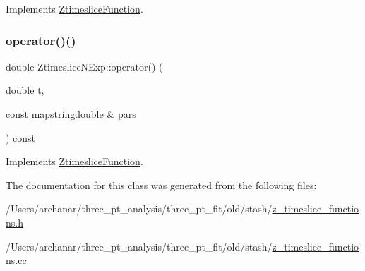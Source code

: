 Implements \mbox{\hyperlink{classZtimesliceFunction_aee3aaf0215deb7e33e609a3d227c28d5}{Ztimeslice\+Function}}.

\mbox{\label{classZtimesliceNExp_a8d550e27c4abc64a0498b224259863b7}} 
\subsubsection{\texorpdfstring{operator()()}{operator()()}\hspace{0.1cm}{\footnotesize\ttfamily [4/4]}}
{\footnotesize\ttfamily double Ztimeslice\+N\+Exp\+::operator() (\begin{DoxyParamCaption}\item[{double}]{t,  }\item[{const \mbox{\hyperlink{lib_2fitting__lib_2includes_8h_a647b481c557c7966517f753340a81d13}{mapstringdouble}} \&}]{pars }\end{DoxyParamCaption}) const\hspace{0.3cm}{\ttfamily [virtual]}}



Implements \mbox{\hyperlink{classZtimesliceFunction_aee3aaf0215deb7e33e609a3d227c28d5}{Ztimeslice\+Function}}.



The documentation for this class was generated from the following files\+:\begin{DoxyCompactItemize}
\item 
/\+Users/archanar/three\+\_\+pt\+\_\+analysis/three\+\_\+pt\+\_\+fit/old/stash/\mbox{\hyperlink{old_2stash_2z__timeslice__functions_8h}{z\+\_\+timeslice\+\_\+functions.\+h}}\item 
/\+Users/archanar/three\+\_\+pt\+\_\+analysis/three\+\_\+pt\+\_\+fit/old/stash/\mbox{\hyperlink{old_2stash_2z__timeslice__functions_8cc}{z\+\_\+timeslice\+\_\+functions.\+cc}}\end{DoxyCompactItemize}
